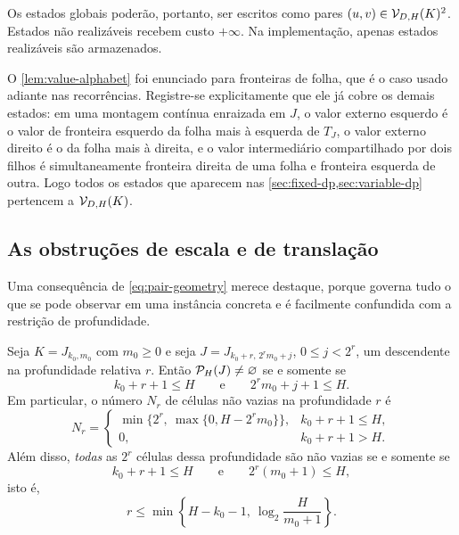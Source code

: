 Os estados globais poderão, portanto, ser escritos como pares
$(u,v)\in\mathcal{V}_{D,H}(K)^2$. Estados não realizáveis recebem custo
$+\infty$. Na implementação, apenas estados realizáveis são armazenados.

O \cref{lem:value-alphabet} foi enunciado para fronteiras de folha, que é o
caso usado adiante nas recorrências. Registre-se explicitamente que ele já
cobre os demais estados: em uma montagem contínua enraizada em $J$, o valor
externo esquerdo é o valor de fronteira esquerdo da folha mais à esquerda de
$T_J$, o valor externo direito é o da folha mais à direita, e o valor
intermediário compartilhado por dois filhos é simultaneamente fronteira
direita de uma folha e fronteira esquerda de outra. Logo todos os estados que
aparecem nas \cref{sec:fixed-dp,sec:variable-dp} pertencem a
$\mathcal{V}_{D,H}(K)$.

\subsection{As obstruções de escala e de translação}

Uma consequência de \eqref{eq:pair-geometry} merece destaque, porque governa
tudo o que se pode observar em uma instância concreta e é facilmente
confundida com a restrição de profundidade.

\begin{proposition}
\label{prop:translation-obstruction}
Seja $K=J_{k_0,m_0}$ com $m_0\ge0$ e seja
$J=J_{k_0+r,\,2^rm_0+j}$, $0\le j<2^r$, um descendente na profundidade
relativa $r$. Então $\mathcal{P}_H(J)\ne\varnothing$ se e somente se
\begin{equation}
 k_0+r+1\le H
 \qquad\text{e}\qquad
 2^rm_0+j+1\le H.
 \label{eq:two-obstructions}
\end{equation}
Em particular, o número $N_r$ de células não vazias na profundidade $r$ é
\begin{equation}
 N_r=
 \begin{cases}
 \min\{2^r,\ \max\{0,H-2^rm_0\}\},&k_0+r+1\le H,\\
 0,&k_0+r+1>H.
 \end{cases}
 \label{eq:nonempty-cell-count}
\end{equation}
Além disso, \emph{todas} as $2^r$ células dessa profundidade são não vazias
se e somente se
\begin{equation}
 k_0+r+1\le H
 \qquad\text{e}\qquad
 2^r(m_0+1)\le H,
 \label{eq:uniform-refinement-conditions}
\end{equation}
isto é,
\begin{equation}
 r\le
 \min\!\left\{H-k_0-1,\ \log_2\frac{H}{m_0+1}\right\}.
 \label{eq:uniform-refinement-depth}
\end{equation}
\end{proposition}

